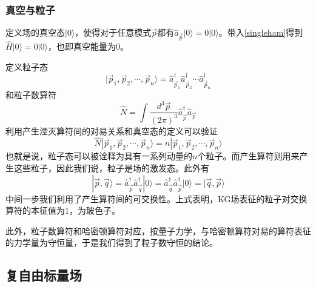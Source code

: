 \documentclass[a4paper,11pt]{ctexart}
\newcommand{\beq}{\begin{equation}}
\newcommand{\eeq}{\end{equation}}
\begin{document}
\subsubsection{真空与粒子}
定义场的真空态$|0\rangle$，使得对于任意模式$\vec{p}$都有$\hat{a}_{\vec{p}} |0\rangle = 0|0\rangle$。带入\cref{singleham}得到$\hat{H}|0\rangle = 0 |0\rangle$，也即真空能量为0。
\par
定义粒子态
\beq
|\vec{p}_1,\vec{p}_2,\cdots,\vec{p}_n\rangle = \hat{a}_{\vec{p}_1}^\dagger \hat{a}_{\vec{p}_2}^\dagger \cdots \hat{a}_{\vec{p}_n}^\dagger
\eeq
和粒子数算符
\beq
\hat{N} = \int \frac{d^3 \vec{p}}{(2\pi)^3} \hat{a}_{\vec{p}}^\dagger \hat{a}_{\vec{p}} 
\eeq
利用产生湮灭算符间的对易关系和真空态的定义可以验证
\beq
\hat{N} |\vec{p}_1,\vec{p}_2,\cdots,\vec{p}_n\rangle = n |\vec{p}_1,\vec{p}_2,\cdots,\vec{p}_n\rangle
\eeq
也就是说，粒子态可以被诠释为具有一系列动量的$n$个粒子。而产生算符则用来产生这些粒子，因此我们说，粒子是场的激发态。此外有
\beq
|\vec{p},\vec{q} \rangle = \hat{a}_{\vec{p}}^\dagger \hat{a}_{\vec{q}}^\dagger |0\rangle = \hat{a}_{\vec{q}}^\dagger \hat{a}_{\vec{p}}^\dagger |0\rangle = |\vec{q},\vec{p} \rangle
\eeq
中间一步我们利用了产生算符间的可交换性。上式表明，KG场表征的粒子对交换算符的本征值为1，为玻色子。
\par
此外，粒子数算符和哈密顿算符对应，按量子力学，与哈密顿算符对易的算符表征的力学量为守恒量，于是我们得到了粒子数守恒的结论。

\subsection{复自由标量场}
\end{document}
